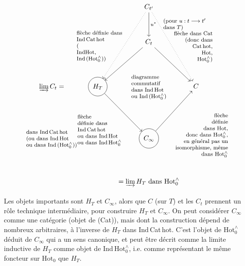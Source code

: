 \documentclass[11pt]{article}
\makeatletter
\newcommand{\printedpage}[1]{\marginpar{\footnotesize p.~#1}}
\newcommand{\msp}[1]{\marginpar{\vspace*{10pt}\footnotesize [#1]}}
\newcommand{\Hotz}{\mathrm{Hot}^{\wedge}_{0}}
\newcommand{\lab}[2][l]{\text{\footnotesize\begin{tabular}{@{}#1@{}}#2\end{tabular}}}
\makeatother
\begin{document}
\msp{page 114}
\printedpage{72}
\[
\begin{tikzcd}[column sep=small, row sep=huge]
 & & C_{t'} \arrow[d, "{u^{*}\quad\lab{(pour $u : t \longrightarrow t'$\\ dans $T$)}}"] \arrow[ldd, dotted] \arrow[rdd, dotted] & \\
 & & C_{t} \arrow[ld, swap, "{\lab{flèche définie dans\\ Ind\,Cat\,hot\\ (\\ IndHot,\\ Ind\,($\Hotz$))}}"] \arrow[rd, "{\lab[r]{flèche dans Cat\\ (donc dans\\ Cat\,hot,\\ Hot,\\ $\Hotz$)}}"] & \\
\varinjlim C_{t} = & |[draw, circle]| H_{T} \arrow[rd, swap, "{\lab{flèche\\ définie dans\\ Ind\,Cat\,hot\\ ou dans Ind\,Hot\\ ou dans Ind\,$\Hotz$}}"] & \lab{diagramme\\ commutatif\\ dans Ind\,Hot\\ ou Ind\,($\Hotz$)} & C \\
\lab{dans Ind\,Cat\,hot\\ (ou dans Ind\,Hot\\ ou dans Ind\,($\Hotz$))} & & |[draw, circle]| C_{\infty} \arrow[ru, swap, "{\lab[r]{flèche\\ définie\\ dans Hot,\\ donc dans $\Hotz$,\\ en général pas un\\ isomorphisme, même\\ dans $\Hotz$}}"] & \\
 & & = \varinjlim H_{T} \text{ dans } \Hotz &
\end{tikzcd}
\]



Les objets importants sont $H_{T}$ et $C_{\infty}$, alors que $C$ (sur $T$) et les $C_{t}$ prennent un rôle technique intermédiaire, pour construire $H_{T}$ et $C_{\infty}$. On peut considérer $C_{\infty}$ comme une catégorie (objet de (Cat)), mais dont la construction dépend de nombreux arbitraires, à l'inverse de $H_{T}$ dans Ind\,Cat\,hot. C'est l'objet de $\Hotz$ déduit de $C_{\infty}$ qui a un sens canonique, et peut être décrit comme la limite inductive de $H_{T}$ comme objet de Ind\,$\Hotz$, i.e. comme représentant le même foncteur sur $\mathrm{Hot}_{0}$ que $H_{T}$.
\end{document}
